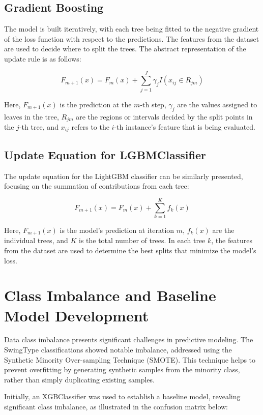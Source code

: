 \documentclass[12pt]{article}
\begin{document}
\subsection*{Gradient Boosting}
The model is built iteratively, with each tree being fitted to the negative gradient of the loss function with respect to the predictions. The features from the dataset are used to decide where to split the trees. The abstract representation of the update rule is as follows:

\[
F_{m+1}(x) = F_m(x) + \sum_{j=1}^J \gamma_j I(x_{ij} \in R_{jm})
\]

Here, \(F_{m+1}(x)\) is the prediction at the \(m\)-th step, \(\gamma_j\) are the values assigned to leaves in the tree, \(R_{jm}\) are the regions or intervals decided by the split points in the \(j\)-th tree, and \(x_{ij}\) refers to the \(i\)-th instance's feature that is being evaluated.

\subsection*{Update Equation for LGBMClassifier}
The update equation for the LightGBM classifier can be similarly presented, focusing on the summation of contributions from each tree:

\[
F_{m+1}(x) = F_m(x) + \sum_{k=1}^K f_k(x)
\]

Here, \(F_{m+1}(x)\) is the model's prediction at iteration \(m\), \(f_k(x)\) are the individual trees, and \(K\) is the total number of trees. In each tree \(k\), the features from the dataset are used to determine the best splits that minimize the model's loss.

\maketitle

\section{Class Imbalance and Baseline Model Development}
Data class imbalance presents significant challenges in predictive modeling. The SwingType classifications showed notable imbalance, addressed using the Synthetic Minority Over-sampling Technique (SMOTE). This technique helps to prevent overfitting by generating synthetic samples from the minority class, rather than simply duplicating existing samples.

Initially, an XGBClassifier was used to establish a baseline model, revealing significant class imbalance, as illustrated in the confusion matrix below:
\end{document}
